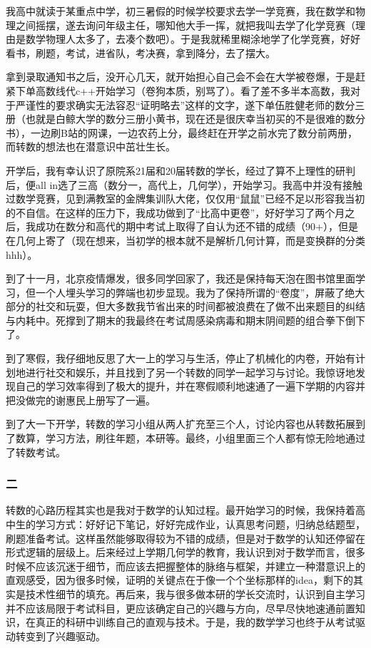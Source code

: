 \documentclass[12pt, a4paper, oneside]{ctexart}
\begin{document}
我高中就读于某重点中学，初三暑假的时候学校要求去学一学竞赛，我在数学和物理之间摇摆，遂去询问年级主任，哪知他大手一挥，就把我叫去学了化学竞赛（理由是数学物理人太多了，去凑个数吧）。于是我就稀里糊涂地学了化学竞赛，好好看书，刷题，考试，进省队，考决赛，拿到降分，去了摆大。

拿到录取通知书之后，没开心几天，就开始担心自己会不会在大学被卷爆，于是赶紧下单高数线代c++开始学习（卷狗本质，别骂了）。看了差不多半本高数，我对于严谨性的要求确实无法容忍“证明略去”这样的文字，遂下单伍胜健老师的数分三册（也就是白鲸大学的数分三册小黄书，现在还是很庆幸当初买的不是很难的数分书），一边刷B站的网课，一边农药上分，最终赶在开学之前水完了数分前两册，而转数的想法也在潜意识中茁壮生长。

开学后，我有幸认识了原院系21届和20届转数的学长，经过了算不上理性的研判后，便all in选了三高（数分一，高代上，几何学），开始学习。我高中并没有接触过数学竞赛，见到满教室的金牌集训队大佬，仅仅用“鼠鼠”已经不足以形容我当初的不自信。在这样的压力下，我成功做到了“比高中更卷”，好好学习了两个月之后，我成功在数分和高代的期中考试上取得了自认为还不错的成绩（90+），但是在几何上寄了（现在想来，当初学的根本就不是解析几何计算，而是变换群的分类hhh）。

到了十一月，北京疫情爆发，很多同学回家了，我还是保持每天泡在图书馆里面学习，但一个人埋头学习的弊端也初步显现。我为了保持所谓的“卷度”，屏蔽了绝大部分的社交和玩耍，但大多数我节省出来的时间都被浪费在了做不出来题目的纠结与内耗中。死撑到了期末的我最终在考试周感染病毒和期末阴间题的组合拳下倒下了。

到了寒假，我仔细地反思了大一上的学习与生活，停止了机械化的内卷，开始有计划地进行社交和娱乐，并且找到了另一个转数的同学一起学习与讨论。我惊讶地发现自己的学习效率得到了极大的提升，并在寒假顺利地速通了一遍下学期的内容并把没做完的谢惠民上册写了一遍。

到了大一下开学，转数的学习小组从两人扩充至三个人，讨论内容也从转数拓展到了数算，学习方法，刷往年题，本研等。最终，小组里面三个人都有惊无险地通过了转数考试。

\subsubsection{二}
转数的心路历程其实也是我对于数学的认知过程。最开始学习的时候，我保持着高中生的学习方式：好好记下笔记，好好完成作业，认真思考问题，归纳总结题型，刷题准备考试。这样虽然能够取得较为不错的成绩，但是对于数学的认知还停留在形式逻辑的层级上。后来经过上学期几何学的教育，我认识到对于数学而言，很多时候不应该沉迷于细节，而应该去把握整体的脉络与框架，并建立一种潜意识上的直观感受，因为很多时候，证明的关键点在于像一个个坐标那样的idea，剩下的其实是技术性细节的填充。再后来，我与很多做本研的学长交流时，认识到自主学习并不应该局限于考试科目，更应该确定自己的兴趣与方向，尽早尽快地速通前置知识，在真正的科研中训练自己的直观与技术。于是，我的数学学习也终于从考试驱动转变到了兴趣驱动。
\end{document}
